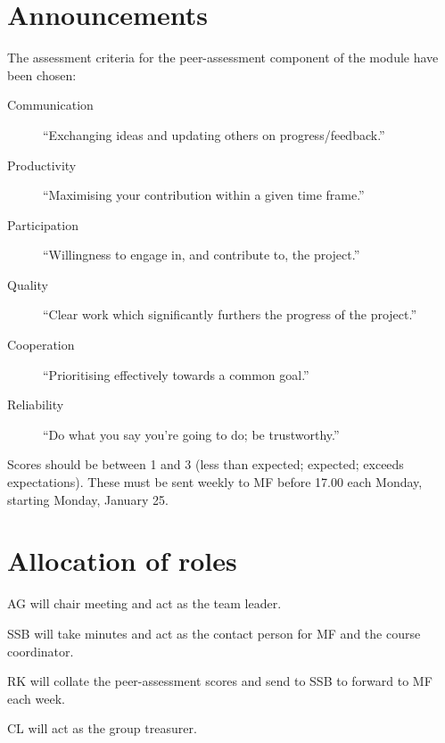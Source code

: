 \documentclass[a4paper,11pt,twoside,class=meetingmins,crop=false]{standalone}
\begin{document}

\maketitle
{}

\section{Announcements}
\begin{hiddenitems}
    \item
    The assessment criteria for the peer-assessment component of the module have been chosen:
    \begin{description}
        \item[Communication] ``Exchanging ideas and updating others on progress/feedback.''
        \item[Productivity] ``Maximising your contribution within a given time frame.''
        \item[Participation] ``Willingness to engage in, and contribute to, the project.''
        \item[Quality] ``Clear work which significantly furthers the progress of the project.''
        \item[Cooperation] ``Prioritising effectively towards a common goal.''
        \item[Reliability] ``Do what you say you're going to do; be trustworthy.''
    \end{description}
    Scores should be between 1 and 3 (less than expected; expected; exceeds expectations).
    These must be sent weekly to MF before 17.00 each Monday, starting Monday, January 25.

\end{hiddenitems}

\section{Allocation of roles}
\begin{items}
    \item AG will chair meeting and act as the team leader.
    \item SSB will take minutes and act as the contact person for MF and the course coordinator.
    \item RK will collate the peer-assessment scores and send to SSB to forward to MF each week.
    \item CL will act as the group treasurer.
\end{items}
\end{document}
